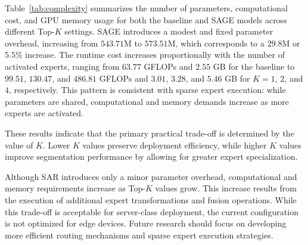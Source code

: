 Table~\ref{tab:complexity} summarizes the number of parameters, computational cost, and GPU memory usage for both the baseline and SAGE models across different Top-$K$ settings. SAGE introduces a modest and fixed parameter overhead, increasing from $543.71$M to $573.51$M, which corresponds to a $29.8$M or $5.5\%$ increase. The runtime cost increases proportionally with the number of activated experts, ranging from $63.77$ GFLOPs and $2.55$ GB for the baseline to $99.51$, $130.47$, and $486.81$ GFLOPs and $3.01$, $3.28$, and $5.46$ GB for $K=1$, $2$, and $4$, respectively. This pattern is consistent with sparse expert execution: while parameters are shared, computational and memory demands increase as more experts are activated.

\begin{table}[t]
\centering
\caption{Comparison of model complexity between the baseline and SAGE across varying Top-$K$ settings.}
\label{tab:complexity}
\setlength{\tabcolsep}{4.5pt}
\small
{}
\normalsize
\setlength{\tabcolsep}{6pt}
\end{table}

These results indicate that the primary practical trade-off is determined by the value of $K$. Lower $K$ values preserve deployment efficiency, while higher $K$ values improve segmentation performance by allowing for greater expert specialization.

Although SAR introduces only a minor parameter overhead, computational and memory requirements increase as Top-$K$ values grow. This increase results from the execution of additional expert transformations and fusion operations. While this trade-off is acceptable for server-class deployment, the current configuration is not optimized for edge devices. Future research should focus on developing more efficient routing mechanisms and sparse expert execution strategies.

